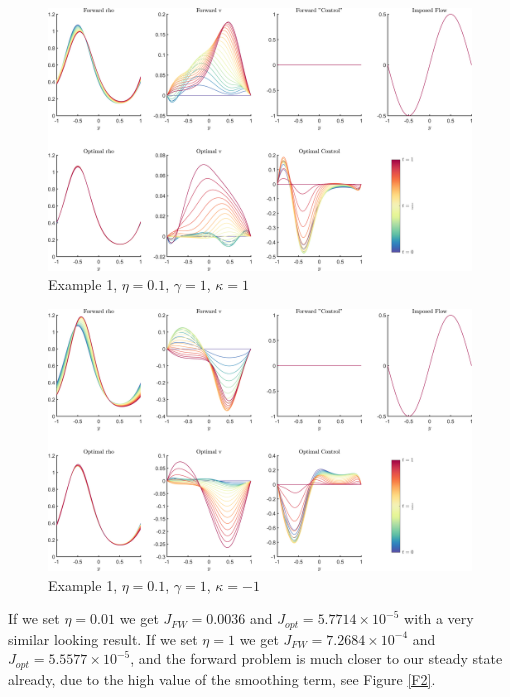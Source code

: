 \documentclass[11pt, a4paper]{article}
\theoremstyle{definition}
\begin{document}
\begin{figure}[h]
	\centering
	\includegraphics[scale=0.04]{Example111.png}
	\caption{Example 1, $\eta = 0.1$, $\gamma = 1$, $\kappa = 1$} 
	\label{F1a}
\end{figure}
\begin{figure}[h]
	\centering
	\includegraphics[scale=0.04]{Example11n1.png}
	\caption{Example 1, $\eta = 0.1$, $\gamma = 1$, $\kappa = -1$} 
	\label{F1b}
\end{figure}
	If we set $\eta = 0.01$ we get $J_{FW} = 0.0036$ and $J_{opt} = 5.7714 \times 10^{-5}$ with a very similar looking result.
	If we set $\eta = 1$ we get $J_{FW} = 7.2684 \times 10^{-4}$ and $J_{opt} = 5.5577 \times 10^{-5}$, and the forward problem is much closer to our steady state already, due to the high value of the smoothing term, see Figure \ref{F2}.
\end{document}
